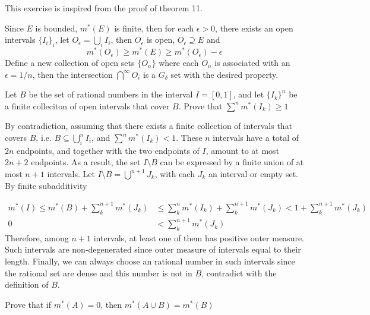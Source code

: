 \begin{solution}
    This exercise is inspired from the proof of theorem 11.

    Since $E$ is bounded, $m^*(E)$ is finite, then for each $\epsilon > 0$, there exists an open intervals $\{I_i\}_i$, let $O_\epsilon=\bigcup_i I_i$, then $O_\epsilon$ is open, $O_\epsilon \supseteq E$ and
    \begin{equation*}
        m^*(O_\epsilon) \geq m^*(E) \geq m^*(O_\epsilon) - \epsilon
    \end{equation*}
    Define a new collection of open sets $\{O_n\}$ where each $O_n$ is associated with an $\epsilon = 1/n$, then the intersection $\bigcap^\infty O_i$ is a $G_\delta$ set with the desired property.
\end{solution}

\begin{exercise}{8}
    Let $B$ be the set of rational numbers in the interval $I=[0, 1]$, and let $\{I_k\}^n$ be a finite colleciton of open intervals that cover $B$. Prove that $\sum^n m^*(I_k) \geq 1$
\end{exercise}

\begin{solution}
    By contradiction, assuming that there exists a finite collection of intervals that covers $B$, i.e. $B \subseteq \bigcup_i^n I_i$, and $\sum^n m^*(I_k)<1$. These $n$ intervals have a total of $2n$ endpoints, and together with the two endpoints of $I$, amount to at most $2n+2$ endpoints. As a result, the set $I\setminus B$ can be expressed by a finite union of at most $n+1$ intervals. 
    Let $I\setminus B = \bigcup^{n+1} J_k$, with each $J_k$ an interval or empty set. By finite subadditivity
    
    \begin{align*}
        m^*(I) \leq m^*(B) + \sum^{n+1}_k m^*(J_k)&\leq \sum^n_k m^*(I_k) + \sum^{n+1}_k m^*(J_k) < 1 + \sum^{n+1}_k m^*(J_k)\\
        0 &< \sum^{n+1}_k m^*(J_k)
    \end{align*}
    Therefore, among $n+1$ intervals, at least one of them has positive outer measure. Such intervals are non-degenerated since outer measure of intervals equal to their length. Finally, we can always choose an rational number in such intervals since the rational set are dense and this number is not in $B$, contradict with the definition of $B$.
\end{solution}

\begin{exercise}{9}
    Prove that if $m^*(A)=0$, then $m^*(A\cup B) = m^*(B)$
\end{exercise}

